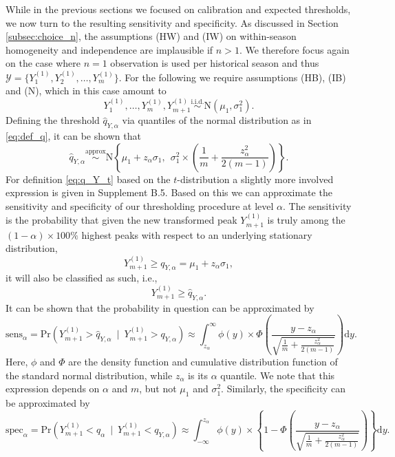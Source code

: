 \documentclass[12pt]{article}
\begin{document}
While in the previous sections we focused on calibration and expected thresholds, we now turn to the resulting sensitivity and specificity. As discussed in Section \ref{subsec:choice_n}, the assumptions (HW) and (IW) on within-season homogeneity and independence are implausible if $n > 1$. We therefore focus again on the case where $n = 1$ observation is used per historical season and thus $\mathcal{Y} = \{Y_1^{(1)}, Y_2^{(1)}, \dots, Y_m^{(1)}\}$. For the following we require assumptions (HB), (IB) and (N), which in this case amount to
\begin{equation}
Y_1^{(1)}, \dots, Y_m^{(1)}, Y_{m + 1}^{(1)} \stackrel{\text{i.i.d.}}{\sim} \text{N}(\mu_1, \sigma^2_1).
\end{equation}
Defining the threshold $\hat{q}_{Y, \alpha}$ via quantiles of the normal distribution as in \eqref{eq:def_q}, it can be shown that
\begin{equation}
\hat{q}_{Y, \alpha} \stackrel{\text{approx}}{\sim} \text{N}\left\{\mu_1 + z_\alpha \sigma_1,\ \ \sigma_1^2 \times \left(\frac{1}{m} + \frac{z_\alpha^2}{2(m - 1)} \right) \right\}.
\label{eq:q_Y}
\end{equation}
For definition \eqref{eq:q_Y_t} based on the $t$-distribution a slightly more involved expression is given in Supplement B.5. Based on this we can approximate the sensitivity and specificity of our thresholding procedure at level $\alpha$. The sensitivity is the probability that given the new transformed peak $Y_{m + 1}^{(1)}$ is truly among the $(1 - \alpha) \times 100\%$ highest peaks with respect to an underlying stationary distribution,
$$
Y_{m + 1}^{(1)} \geq q_{Y, \alpha} = \mu_1 + z_\alpha \sigma_1,
$$
it will also be classified as such, i.e.,
$$
Y_{m + 1}^{(1)} \geq \hat{q}_{Y, \alpha}.
$$
It can be shown that the probability in question can be approximated by
\begin{equation}
\text{sens}_\alpha = \text{Pr}\left(Y_{m + 1}^{(1)} > \hat{q}_{Y, \alpha} \ \mid \ Y_{m + 1}^{(1)} > q_{Y, \alpha}\right) \approx \int_{z_\alpha}^\infty \phi(y) \times \Phi\left(\frac{y - z_\alpha}{\sqrt{\frac{1}{m} + \frac{z_\alpha^2}{2(m - 1)}}}\right) \text{d}y.
\label{eq:sens}
\end{equation}
Here, $\phi$ and $\Phi$ are the density function and cumulative distribution function of the standard normal distribution, while $z_\alpha$ is its $\alpha$ quantile. We note that this expression depends on $\alpha$ and $m$, but not $\mu_1$ and $\sigma^2_1$. Similarly, the specificity can be approximated by
\begin{equation}
\text{spec}_\alpha = \text{Pr}\left(Y_{m + 1}^{(1)} < \hat{q}_\alpha \ \mid \ Y_{m + 1}^{(1)} < q_{Y, \alpha}\right) \approx \int_{-\infty}^{z_\alpha}\phi(y) \times \left\{1 - \Phi\left(\frac{y - z_\alpha}{\sqrt{\frac{1}{m} + \frac{z_\alpha^2}{2(m - 1)}}}\right)\right\} \text{d}y.
\label{eq:spec}
\end{equation}
\end{document}
